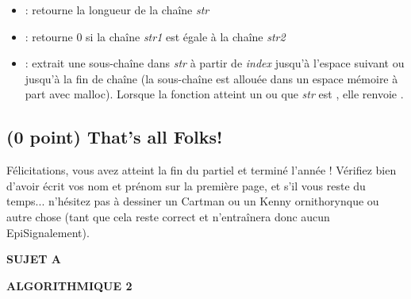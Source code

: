 \documentclass[11pt,a4paper]{article}
\newcommand{\TitreMatiere}{Algorithmique 2}
\begin{document}
\begin{itemize}
\item {} : retourne la longueur de la chaîne \textit{str}
\item {} : retourne 0 si la chaîne \textit{str1} est égale à la chaîne \textit{str2}
\item {} : extrait une sous-chaîne dans \textit{str} à partir de \textit{index} jusqu'à l'espace suivant ou jusqu'à la fin de chaîne (la sous-chaîne est allouée dans un espace mémoire à part avec malloc). Lorsque la fonction atteint un  ou que \textit{str} est , elle renvoie .
\end{itemize}


\begin{center}
\end{center}



\subsection{(0 point) That's all Folks!}

\noindent Félicitations, vous avez atteint la fin du partiel et terminé l'année !
Vérifiez bien d'avoir écrit vos nom et prénom sur la première page, et s'il vous reste du temps... n'hésitez pas à dessiner un Cartman ou un Kenny ornithorynque ou autre chose (tant que cela reste correct et n'entraînera donc aucun EpiSignalement).

\clearpage



\vfillFirst

\begin{center}

\begin{LARGE}
\textbf{SUJET A}

\bigskip

\textbf{\MakeUppercase{\TitreMatiere}}
\end{LARGE}

\end{center}

\vfillLast
\end{document}
